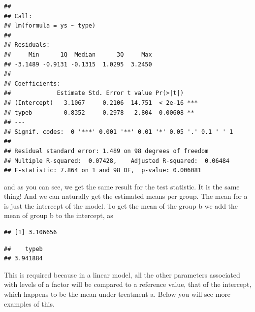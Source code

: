 \documentclass[
]{book}
\newenvironment{Shaded}{\begin{snugshade}}{\end{snugshade}}
\newcommand{\CommentTok}[1]{\textcolor[rgb]{0.56,0.35,0.01}{\textit{#1}}}
\newcommand{\DecValTok}[1]{\textcolor[rgb]{0.00,0.00,0.81}{#1}}
\newcommand{\KeywordTok}[1]{\textcolor[rgb]{0.13,0.29,0.53}{\textbf{#1}}}
\newcommand{\NormalTok}[1]{#1}
\newcommand{\OperatorTok}[1]{\textcolor[rgb]{0.81,0.36,0.00}{\textbf{#1}}}
\begin{document}
\begin{verbatim}
## 
## Call:
## lm(formula = ys ~ type)
## 
## Residuals:
##     Min      1Q  Median      3Q     Max 
## -3.1489 -0.9131 -0.1315  1.0295  3.2450 
## 
## Coefficients:
##             Estimate Std. Error t value Pr(>|t|)    
## (Intercept)   3.1067     0.2106  14.751  < 2e-16 ***
## typeb         0.8352     0.2978   2.804  0.00608 ** 
## ---
## Signif. codes:  0 '***' 0.001 '**' 0.01 '*' 0.05 '.' 0.1 ' ' 1
## 
## Residual standard error: 1.489 on 98 degrees of freedom
## Multiple R-squared:  0.07428,	Adjusted R-squared:  0.06484 
## F-statistic: 7.864 on 1 and 98 DF,  p-value: 0.006081
\end{verbatim}

and as you can see, we get the same result for the test statistic. It is the same thing! And we can naturally get the estimated means per group. The mean for a is just the intercept of the model. To get the mean of the group b we add the mean of group b to the intercept, as

\begin{Shaded}
\end{Shaded}

\begin{verbatim}
## [1] 3.106656
\end{verbatim}

\begin{Shaded}
\end{Shaded}

\begin{verbatim}
##    typeb 
## 3.941884
\end{verbatim}

This is required because in a linear model, all the other parameters associated with levels of a factor will be compared to a reference value, that of the intercept, which happens to be the mean under treatment a. Below you will see more examples of this.
\end{document}
